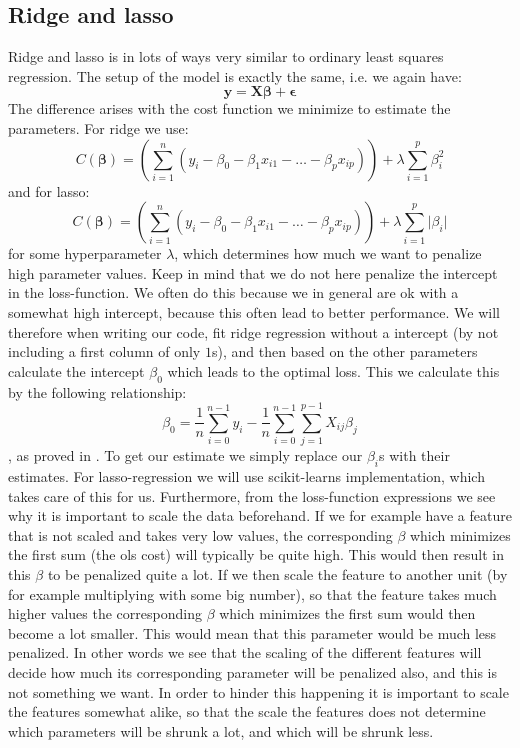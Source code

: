 \documentclass{article}
\begin{document}
\subsection{Ridge and lasso}
\label{ridge-lasso-model-sec}
Ridge and lasso is in lots of ways very similar to ordinary least squares
regression. The setup of the model is exactly the same, i.e. we again have:
$$\mathbf{y} = \mathbf{X} \bm{\beta} + \mathbf{\epsilon}$$
The difference arises with the cost function we minimize to estimate the parameters. For ridge we use:
$$C(\bm{\beta}) = \left(\sum_{i=1}^{n} (y_i - \beta_0 - \beta_1 x_{i 1} - \dots - \beta_{p} x_{i p})\right) + \lambda \sum_{i=1}^p \beta_i^2$$
and for lasso:
$$C(\bm{\beta}) = \left(\sum_{i=1}^{n} (y_i - \beta_0 - \beta_1 x_{i 1} - \dots - \beta_{p} x_{i p})\right) + \lambda \sum_{i=1}^p \lvert \beta_i \rvert$$
for some hyperparameter $\lambda$, which determines how much we want to penalize
high parameter values. Keep in mind that we do not here penalize the intercept
in the loss-function. We often do this because we in general are ok with a
somewhat high intercept, because this often lead to better performance. We will
therefore when writing our code, fit ridge regression without a intercept (by
not including a first column of only $1$s), and then based on the other
parameters calculate the intercept $\beta_0$ which leads to the optimal
loss. This we calculate this by the following relationship:
$$\beta_0 = \frac{1}{n} \sum_{i=0}^{n-1} y_i - \frac{1}{n} \sum_{i=0}^{n-1} \sum_{j=1}^{p-1} X_{i j} \beta_j$$
, as proved in \cite[s.~Further manipulations]{week35notes}. To get our
estimate we simply replace our $\beta_i$s with their estimates. For
lasso-regression we will use scikit-learns implementation, which takes care of
this for us. Furthermore, from the loss-function expressions we see why it is
important to scale the data beforehand. If we for example have a feature that is
not scaled and takes very low values, the corresponding $\beta$ which
minimizes the first sum (the ols cost) will typically be quite high. This would
then result in this $\beta$ to be penalized quite a lot. If we then scale the
feature to another unit (by for example multiplying with some big number), so
that the feature takes much higher values the corresponding $\beta$ which
minimizes the first sum would then become a lot smaller. This would mean that
this parameter would be much less penalized. In other words we see that the
scaling of the different features will decide how much its corresponding
parameter will be penalized also, and this is not something we want. In order to
hinder this happening it is important to scale the features somewhat alike, so
that the scale the features does not determine which parameters will be shrunk
a lot, and which will be shrunk less.
\end{document}
